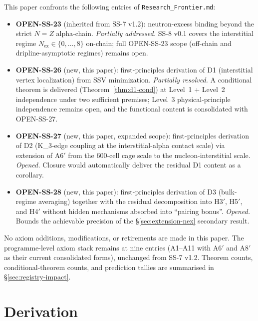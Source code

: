 \documentclass[11pt,letterpaper]{article}
\theoremstyle{definition}
\newcommand{\Nex}{N_{\text{ex}}}
\newcommand{\Kthree}{K_3}
\begin{document}
This paper confronts the following entries of \texttt{Research\_Frontier.md}:

\begin{itemize}
  \item \textbf{OPEN-SS-23} (inherited from SS-7 v1.2): neutron-excess binding beyond the strict $N = Z$ alpha-chain. \emph{Partially addressed.} SS-8 v0.1 covers the interstitial regime $\Nex \in \{0, \ldots, 8\}$ on-chain; full OPEN-SS-23 scope (off-chain and dripline-asymptotic regimes) remains open.
  \item \textbf{OPEN-SS-26} (new, this paper): first-principles derivation of D1 (interstitial vertex localization) from SSV minimization. \emph{Partially resolved.} A conditional theorem is delivered (Theorem~\ref{thm:d1-cond}) at Level~1 + Level~2 independence under two sufficient premises; Level~3 physical-principle independence remains open, and the functional content is consolidated with OPEN-SS-27.
  \item \textbf{OPEN-SS-27} (new, this paper, expanded scope): first-principles derivation of D2 (\Kthree-edge coupling at the interstitial-alpha contact scale) via extension of A6$'$ from the 600-cell cage scale to the nucleon-interstitial scale. \emph{Opened.} Closure would automatically deliver the residual D1 content as a corollary.
  \item \textbf{OPEN-SS-28} (new, this paper): first-principles derivation of D3 (bulk-regime averaging) together with the residual decomposition into H3$'$, H5$'$, and H4$'$ without hidden mechanisms absorbed into ``pairing bonus''. \emph{Opened.} Bounds the achievable precision of the \S\ref{sec:extension-nex} secondary result.
\end{itemize}

No axiom additions, modifications, or retirements are made in this paper. The programme-level axiom stack remains at nine entries (A1--A11 with A6$'$ and A8$'$ as their current consolidated forms), unchanged from SS-7 v1.2. Theorem counts, conditional-theorem counts, and prediction tallies are summarised in \S\ref{sec:registry-impact}.


\section{Derivation}
\label{sec:derivation}
\end{document}
